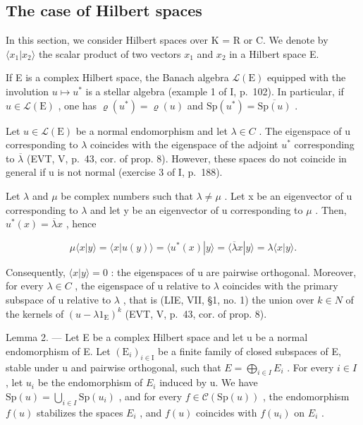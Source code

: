 \subsection{The case of Hilbert spaces}

In this section, we consider Hilbert spaces over K = R or C. We denote by \(\langle x_{1}|x_{2}\rangle\) the scalar product of two vectors \(x_{1}\) and \(x_{2}\) in a Hilbert space E.

If E is a complex Hilbert space, the Banach algebra \(\mathcal{L}(\mathrm{E})\) equipped with the involution \(u\mapsto u^{*}\) is a stellar algebra (example 1 of I, p.~102). In particular, if \(u\in \mathcal{L}(\mathrm{E})\) , one has \(\varrho (u^{*}) = \varrho (u)\) and \(\mathrm{Sp}(u^{*}) = \overline{\mathrm{Sp}(u)}\) .

Let \(u \in \mathcal{L}(\mathrm{E})\) be a normal endomorphism and let \(\lambda \in C\) . The eigenspace of u corresponding to \(\lambda\) coincides with the eigenspace of the adjoint \(u^{*}\) corresponding to \(\overline{\lambda}\) (EVT, V, p.~43, cor. of prop. 8). However, these spaces do not coincide in general if u is not normal (exercise 3 of I, p.~188).

Let \(\lambda\) and \(\mu\) be complex numbers such that \(\lambda \neq \mu\) . Let x be an eigenvector of u corresponding to \(\lambda\) and let y be an eigenvector of u corresponding to \(\mu\) . Then, \(u^{*}(x) = \overline{\lambda}x\) , hence

\[
\mu \langle x | y \rangle = \langle x | u (y) \rangle = \langle u ^ {*} (x) | y \rangle = \langle \overline {{\lambda}} x | y \rangle = \lambda \langle x | y \rangle .
\]

Consequently, \(\langle x|y\rangle = 0\) : the eigenspaces of u are pairwise orthogonal. Moreover, for every \(\lambda \in C\) , the eigenspace of u relative to \(\lambda\) coincides with the primary subspace of u relative to \(\lambda\) , that is (LIE, VII, §1, no. 1) the union over \(k \in N\) of the kernels of \((u - \lambda1_{\mathrm{E}})^{k}\) (EVT, V, p.~43, cor. of prop. 8).

Lemma 2. --- Let E be a complex Hilbert space and let u be a normal endomorphism of E. Let \((\mathrm{E}_{i})_{i\in\mathrm{I}}\) be a finite family of closed subspaces of E, stable under u and pairwise orthogonal, such that \(E=\bigoplus_{i\in I}E_{i}\) . For every \(i\in I\) , let \(u_{i}\) be the endomorphism of \(E_{i}\) induced by u. We have \(\mathrm{Sp}(u)=\bigcup_{i\in I}\mathrm{Sp}(u_{i})\) , and for every \(f\in\mathcal{C}(\mathrm{Sp}(u))\) , the endomorphism \(f(u)\) stabilizes the spaces \(E_{i}\) , and \(f(u)\) coincides with \(f(u_{i})\) on \(E_{i}\) .

